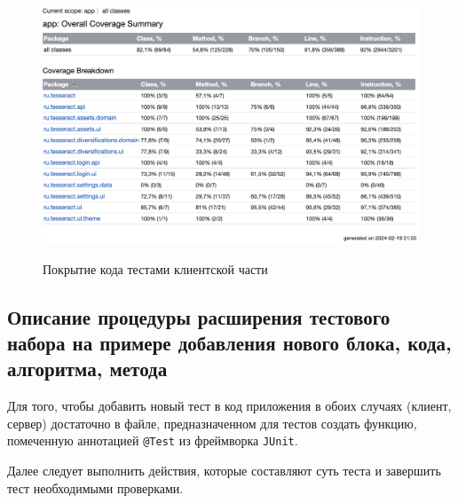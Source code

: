 \documentclass[a4paper, 14pt]{article}
\begin{document}
\begin{figure}[H]
    \centering
    \includegraphics[width=13cm]{resources/5.png}\\
    \caption{Покрытие кода тестами клиентской части}
\end{figure}

\subsection{Описание процедуры расширения тестового набора на примере добавления нового блока, кода, алгоритма, метода}

Для того, чтобы добавить новый тест в код приложения в обоих случаях (клиент, сервер) достаточно в файле, предназначенном для тестов создать функцию, помеченную аннотацией \texttt{@Test} из фреймворка \texttt{JUnit}.

Далее следует выполнить действия, которые составляют суть теста и завершить тест необходимыми проверками.
\end{document}
